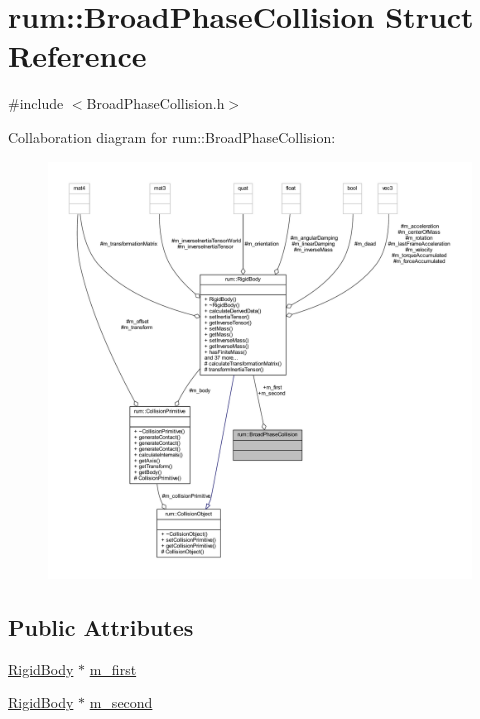 \hypertarget{structrum_1_1_broad_phase_collision}{}\section{rum\+:\+:Broad\+Phase\+Collision Struct Reference}
\label{structrum_1_1_broad_phase_collision}


{\ttfamily \#include $<$Broad\+Phase\+Collision.\+h$>$}



Collaboration diagram for rum\+:\+:Broad\+Phase\+Collision\+:\nopagebreak
\begin{figure}[H]
\begin{center}
\leavevmode
\includegraphics[width=350pt]{structrum_1_1_broad_phase_collision__coll__graph}
\end{center}
\end{figure}
\subsection*{Public Attributes}
\begin{DoxyCompactItemize}
\item 
\mbox{\hyperlink{classrum_1_1_rigid_body}{Rigid\+Body}} $\ast$ \mbox{\hyperlink{structrum_1_1_broad_phase_collision_a31f6b464da91dd2236795ecfbf1b13fc}{m\+\_\+first}}
\item 
\mbox{\hyperlink{classrum_1_1_rigid_body}{Rigid\+Body}} $\ast$ \mbox{\hyperlink{structrum_1_1_broad_phase_collision_a2357209b8ccc907b694f9642cce213bb}{m\+\_\+second}}
\end{DoxyCompactItemize}


